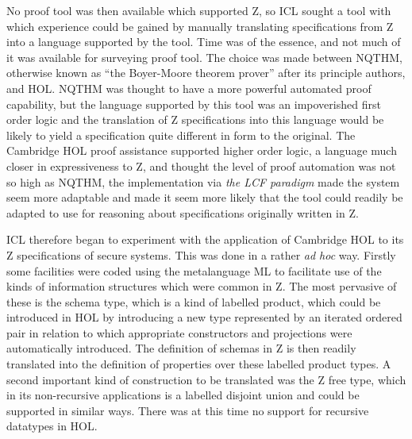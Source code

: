 \documentclass[10pt,titlepage]{book}
\begin{document}
No proof tool was then available which supported Z, so ICL sought a tool with which experience could be gained by manually translating specifications from Z into a language supported by the tool.
Time was of the essence, and not much of it was available for surveying proof tool.
The choice was made between NQTHM, otherwise known as ``the Boyer-Moore theorem prover'' after its principle authors, and HOL.
NQTHM was thought to have a more powerful automated proof capability, but the language supported by this tool was an impoverished first order logic and the translation of Z specifications into this language would be likely to yield a specification quite different in form to the original.
The Cambridge HOL proof assistance supported higher order logic, a language much closer in expressiveness to Z, and thought the level of proof automation was not so high as NQTHM, the implementation via {\it the LCF paradigm} made the system seem more adaptable and made it seem more likely that the tool could readily be adapted to use for reasoning about specifications originally written in Z.

ICL therefore began to experiment with the application of Cambridge HOL to its Z specifications of secure systems.
This was done in a rather {\it ad hoc} way.
Firstly some facilities were coded using the metalanguage ML to facilitate use of the kinds of information structures which were common in Z.
The most pervasive of these is the schema type, which is a kind of labelled product, which could be introduced in HOL by introducing a new type represented by an iterated ordered pair in relation to which appropriate constructors and projections were automatically introduced.
The definition of schemas in Z is then readily translated into the definition of properties over these labelled product types.
A second important kind of construction to be translated was the Z free type, which in its non-recursive applications is a labelled disjoint union and could be supported in similar ways.
There was at this time no support for recursive datatypes in HOL.
\end{document}
